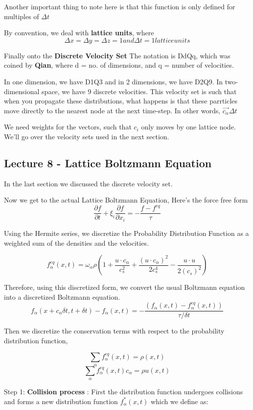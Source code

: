 \documentclass{article}
\begin{document}
Another important thing to note here is that this function is only defined for multiples of $\Delta t$

By convention, we deal with \textbf{lattice units}, where
\[
	\Delta x = \Delta y = \Delta z = 1 and \Delta t = 1 lattice units
\]

Finally onto the \textbf{Discrete Velocity Set}
The notation is DdQq, which was coined by \textbf{Qian}, where d = no. of dimensions, and q = number of velocities.

In one dimension, we have D1Q3 and in 2 dimensions, we have D2Q9. In two-dimensional space, we have 9 discrete velocities. This velocity set is such that when you propagate these distributions, what happens is that these parrticles move directly to the nearest node at the next time-step. In other words, $\vec{c_\alpha} \Delta t$

We need weights for the vectors, such that $c_i$ only moves by one lattice node. We'll go over the velocity sets used in the next section.

\subsection{Lecture 8 - Lattice Boltzmann Equation}
In the last section we discussed the discrete velocity set. 

Now we get to the actual Lattice Boltzmann Equation,
Here's the force free form
\[
	\frac{\partial f}{\partial t} + \xi_i \frac{\partial f}{\partial x_i} = - \frac{f-f^{eq}}{\tau}
\]

Using the Hermite series, we discretize the Probability Distribution Function as a weighted sum of the densities and the velocities.

\[
	f^{eq}_\alpha(x,t) = \omega_\alpha\rho(1 + \frac{u \cdot c_\alpha}{c_s^{2}} + \frac{(u \cdot c_\alpha)^{2}}{2c_s^{4}} - \frac{u\cdot u}{2(c_s)^2})
\]

Therefore, using this discretized form, we convert the usual Boltzmann equation into a discretized Boltzmann equation.
\[f_\alpha(x + c_\alpha\delta t , t + \delta t) - f_\alpha(x,t) = -\frac{(f_\alpha(x,t) - f^{eq}_\alpha(x,t))}{\tau/\delta t}\]

Then we discretize the conservation terms with respect to the probability distribution function,

\[\sum_\alpha f^{eq}_\alpha(x,t) = \rho(x,t)\]
\[\sum_\alpha f^{eq}_\alpha(x,t)c_\alpha = \rho u(x,t)\]



Step 1: \textbf{Collision process} : First the distribution function undergoes collisions and forms a new distribution function $f^{*}_\alpha(x , t)$ which we define as:
\end{document}
